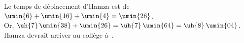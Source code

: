    Le temps de déplacement d'Hamza est de \\
   $\umin{6}+\umin{16}+\umin{4} =\umin{26}$. \\
   Or, $\uh{7}\,\umin{38}+\umin{26} =\uh{7}\,\umin{64} =\uh{8}\,\umin{04}$. \\
   {\blue Hamza devrait arriver au collège à \,}. \\
